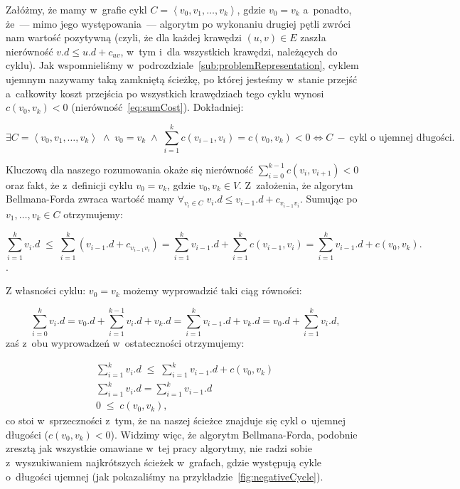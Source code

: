 Załóżmy, że mamy w~grafie cykl $C = \left \langle v_{0}, v_{1}, \dots, v_{k} \right \rangle$, gdzie $ v_{0} = v_{k}$ a~ponadto, że~--- mimo jego występowania~--- algorytm po wykonaniu drugiej pętli zwróci nam wartość pozytywną \textsf{\KwTrue} (czyli, że dla każdej krawędzi $\left( u, v \right) \in E$ zaszła nierówność $v.d \leqslant u.d + c_{uv}$, w~tym i~dla wszystkich krawędzi, należących do cyklu).
Jak wspomnieliśmy w~podrozdziale~\ref{sub:problemRepresentation}, cyklem ujemnym nazywamy taką zamkniętą ścieżkę, po której jesteśmy w~stanie przejść a~całkowity koszt przejścia po wszystkich krawędziach tego cyklu wynosi $c \left( v_{0}, v_{k} \right) < 0$ (nierówność~\ref{eq:sumCost}).
Dokładniej:

\begin{equation}
	\exists C = \left \langle v_{0}, v_{1}, \dots, v_{k} \right \rangle \; \wedge \; v_{0} = v_{k} \; \wedge \; \sum _{i=1}^{k} c \left( v_{i-1}, v_{i} \right ) = c \left( v_{0}, v_{k} \right) < 0 \Leftrightarrow C \: - \: \textrm{cykl o~ujemnej długości.}
\end{equation}

Kluczową dla naszego rozumowania okaże się nierówność $\sum _{i=0}^{k-1} c \left( v_{i}, v_{i+1} \right ) < 0$ oraz fakt, że z~definicji cyklu $v_{0} = v_{k}$, gdzie $v_{0}, v_{k} \in V$.
Z~założenia, że algorytm Bellmana-Forda zwraca wartość \textsf{\KwTrue} mamy $\forall_{v_{i} \in C} \; v_{i}.d \leqslant v_{i-1}.d + c_{v_{i-1}v_{i}}$.
Sumując po $v_{1}, \dots, v_{k} \in C$ otrzymujemy:

\begin{equation}
	\sum _{i=1}^{k} v_{i}.d \; \leqslant \; \sum _{i=1}^{k} \left( v_{i-1}.d + c_{v_{i-1}v_{i}} \right) = \sum _{i=1}^{k} v_{i-1}.d + \sum _{i=1}^{k} c \left( v_{i-1}, v_{i} \right ) = \sum _{i=1}^{k} v_{i-1}.d + c \left( v_{0}, v_{k} \right)\textrm{.}
\end{equation}.

Z własności cyklu: $v_{0} = v_{k}$ możemy wyprowadzić taki ciąg równości:

\begin{equation}
	\sum _{i=0}^{k} v_{i}.d = v_{0}.d + \sum _{i=1}^{k-1} v_{i}.d + v_{k}.d = \sum _{i=1}^{k} v_{i-1}.d + v_{k}.d = v_{0}.d + \sum _{i=1}^{k} v_{i}.d\textrm{,}
\end{equation}
zaś z~obu wyprowadzeń w~ostateczności otrzymujemy:

\begin{gather*}
	\sum _{i=1}^{k} v_{i}.d \; \leqslant \; \sum _{i=1}^{k} v_{i-1}.d + c \left( v_{0}, v_{k} \right) \\
	\sum _{i=1}^{k} v_{i}.d = \sum _{i=1}^{k} v_{i-1}.d \\
	0 \; \leqslant \; c \left( v_{0}, v_{k} \right)\textrm{,}
\end{gather*}
co stoi w~sprzeczności z~tym, że na naszej ścieżce znajduje się cykl o~ujemnej długości ($c \left( v_{0}, v_{k} \right) < 0 $).
Widzimy więc, że algorytm Bellmana-Forda, podobnie zresztą jak wszystkie omawiane w~tej pracy algorytmy, nie radzi sobie z~wyszukiwaniem najkrótszych ścieżek w~grafach, gdzie występują cykle o~długości ujemnej (jak pokazaliśmy na przykładzie~\ref{fig:negativeCycle}).

